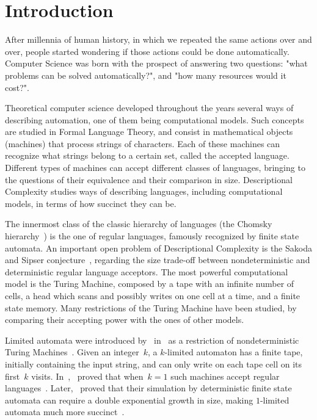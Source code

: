 \chapter{Introduction}
After millennia of human history, in which we repeated the same actions over and over, people started wondering if those actions could be done automatically.
Computer Science was born with the prospect of answering two questions: "what problems can be solved automatically?", and "how many resources would it cost?".

Theoretical computer science developed throughout the years several ways of describing automation, one of them being computational models.
Such concepts are studied in Formal Language Theory, and consist in mathematical objects (machines) that process strings of characters.
Each of these machines can recognize what strings belong to a certain set, called the accepted language.
Different types of machines can accept different classes of languages, bringing to the questions of their equivalence and their comparison in size.
Descriptional Complexity studies ways of describing languages, including computational models, in terms of how succinct they can be.

The innermost class of the classic hierarchy of languages (the Chomsky hierarchy~\cite{Cho56}) is the one of regular languages, famously recognized by finite state automata.
An important open problem of Descriptional Complexity is the Sakoda and Sipser conjecture~\cite{SakSip78}, regarding the size trade-off between nondeterministic and deterministic regular language acceptors.
The most powerful computational model is the Turing Machine, composed by a tape with an infinite number of cells, a head which scans and possibly writes on one cell at a time, and a finite state memory.
Many restrictions of the Turing Machine have been studied, by comparing their accepting power with the ones of other models.

Limited automata were introduced by~\citeauthor{Hib67} in~\citeyear{Hib67} as a restriction of nondeterministic Turing Machines~\cite{Hib67}.
Given an integer~$k$, a $k$-limited automaton has a finite tape, initially containing the input string, and can only write on each tape cell on its first~$k$ visits.
In~\citeyear{WagWec86},~\citeauthor{WagWec86} proved that when~$k=1$ such machines accept regular languages~\cite{WagWec86}.
Later,~\citeauthor{PigPis14} proved that their simulation by deterministic finite state automata can require a double exponential growth in size, making $1$-limited automata much more succinct~\cite{PigPis14}.

